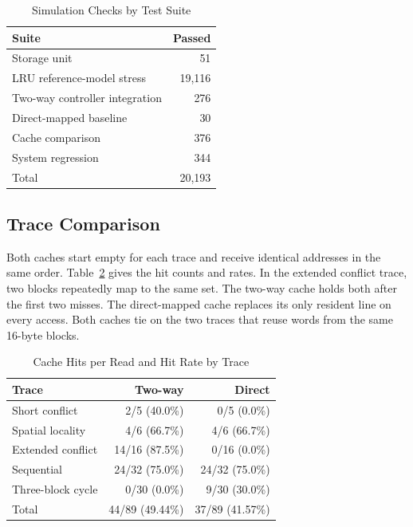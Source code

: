 \documentclass[conference]{IEEEtran}
\begin{document}
\begin{table}[ht]
\centering
\caption{Simulation Checks by Test Suite}
\label{tab:verification}
\begin{tabular}{@{}lr@{}}
\toprule
Suite & Passed \\
\midrule
Storage unit & 51 \\
LRU reference-model stress & 19,116 \\
Two-way controller integration & 276 \\
Direct-mapped baseline & 30 \\
Cache comparison & 376 \\
System regression & 344 \\
\midrule
Total & 20,193 \\
\bottomrule
\end{tabular}
\end{table}

\subsection{Trace Comparison}

Both caches start empty for each trace and receive identical addresses
in the same order. Table~\ref{tab:traces} gives the hit counts and rates. In the
extended conflict trace, two blocks repeatedly map to the same set. The
two-way cache holds both after the first two misses. The direct-mapped
cache replaces its only resident line on every access. Both caches tie
on the two traces that reuse words from the same 16-byte blocks.

\begin{table}[ht]
\centering
\caption{Cache Hits per Read and Hit Rate by Trace}
\label{tab:traces}
\small
\begin{tabular}{@{}lrr@{}}
\toprule
Trace & Two-way & Direct \\
\midrule
Short conflict & 2/5 (40.0\%) & 0/5 (0.0\%) \\
Spatial locality & 4/6 (66.7\%) & 4/6 (66.7\%) \\
Extended conflict & 14/16 (87.5\%) & 0/16 (0.0\%) \\
Sequential & 24/32 (75.0\%) & 24/32 (75.0\%) \\
Three-block cycle & 0/30 (0.0\%) & 9/30 (30.0\%) \\
\midrule
Total & 44/89 (49.44\%) & 37/89 (41.57\%) \\
\bottomrule
\end{tabular}
\end{table}
\end{document}
